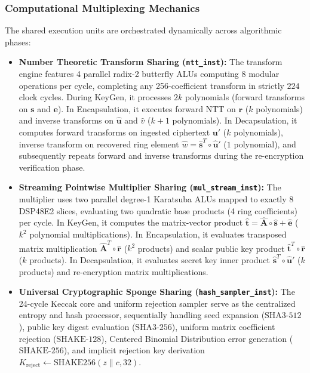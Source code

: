\subsubsection{Computational Multiplexing Mechanics}
The shared execution units are orchestrated dynamically across algorithmic phases:
\begin{itemize}
    \item \textbf{Number Theoretic Transform Sharing (\texttt{ntt\_inst}):} The transform engine features 4 parallel radix-2 butterfly ALUs computing 8 modular operations per cycle, completing any 256-coefficient transform in strictly $224$ clock cycles. During KeyGen, it processes $2k$ polynomials (forward transforms on $\mathbf{s}$ and $\mathbf{e}$). In Encapsulation, it executes forward NTT on $\mathbf{r}$ ($k$ polynomials) and inverse transforms on $\hat{\mathbf{u}}$ and $\hat{v}$ ($k+1$ polynomials). In Decapsulation, it computes forward transforms on ingested ciphertext $\mathbf{u}'$ ($k$ polynomials), inverse transform on recovered ring element $\hat{w} = \hat{\mathbf{s}}^T \circ \hat{\mathbf{u}}'$ ($1$ polynomial), and subsequently repeats forward and inverse transforms during the re-encryption verification phase.
    \item \textbf{Streaming Pointwise Multiplier Sharing (\texttt{mul\_stream\_inst}):} The multiplier uses two parallel degree-1 Karatsuba ALUs mapped to exactly 8 DSP48E2 slices, evaluating two quadratic base products (4 ring coefficients) per cycle. In KeyGen, it computes the matrix-vector product $\hat{\mathbf{t}} = \hat{\mathbf{A}} \circ \hat{\mathbf{s}} + \hat{\mathbf{e}}$ ($k^2$ polynomial multiplications). In Encapsulation, it evaluates transposed matrix multiplication $\hat{\mathbf{A}}^T \circ \hat{\mathbf{r}}$ ($k^2$ products) and scalar public key product $\hat{\mathbf{t}}^T \circ \hat{\mathbf{r}}$ ($k$ products). In Decapsulation, it evaluates secret key inner product $\hat{\mathbf{s}}^T \circ \hat{\mathbf{u}}'$ ($k$ products) and re-encryption matrix multiplications.
    \item \textbf{Universal Cryptographic Sponge Sharing (\texttt{hash\_sampler\_inst}):} The 24-cycle Keccak core and uniform rejection sampler serve as the centralized entropy and hash processor, sequentially handling seed expansion ($\text{SHA3-512}$), public key digest evaluation ($\text{SHA3-256}$), uniform matrix coefficient rejection ($\text{SHAKE-128}$), Centered Binomial Distribution error generation ($\text{SHAKE-256}$), and implicit rejection key derivation $K_{\text{reject}} \leftarrow \text{SHAKE256}(z \parallel c, 32)$.
\end{itemize}

